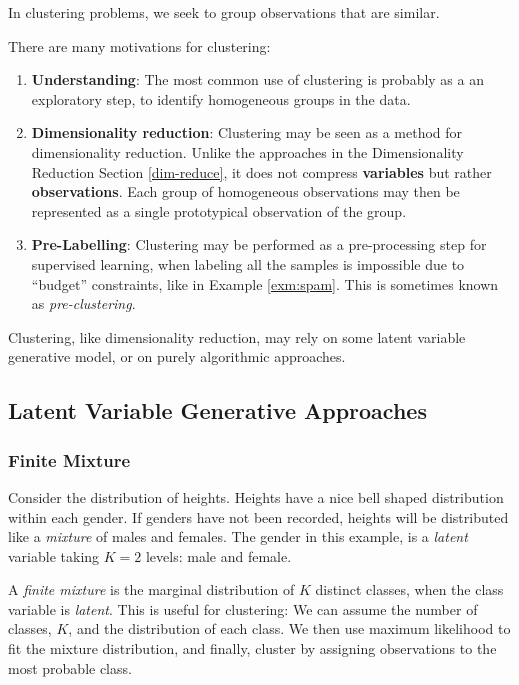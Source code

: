 \documentclass[]{book}
\providecommand{\tightlist}{%
  \setlength{\itemsep}{0pt}\setlength{\parskip}{0pt}}
\theoremstyle{definition}
\theoremstyle{definition}
\theoremstyle{definition}
\theoremstyle{remark}
\let\BeginKnitrBlock\begin \let\EndKnitrBlock\end
\begin{document}
In clustering problems, we seek to group observations that are similar.

There are many motivations for clustering:

\begin{enumerate}
\def\labelenumi{\arabic{enumi}.}
\tightlist
\item
  \textbf{Understanding}:
  The most common use of clustering is probably as a an exploratory step, to identify homogeneous groups in the data.
\item
  \textbf{Dimensionality reduction}:
  Clustering may be seen as a method for dimensionality reduction.
  Unlike the approaches in the Dimensionality Reduction Section \ref{dim-reduce}, it does not compress \textbf{variables} but rather \textbf{observations}.
  Each group of homogeneous observations may then be represented as a single prototypical observation of the group.
\item
  \textbf{Pre-Labelling}:
  Clustering may be performed as a pre-processing step for supervised learning, when labeling all the samples is impossible due to ``budget'' constraints, like in Example \ref{exm:spam}. This is sometimes known as \emph{pre-clustering}.
\end{enumerate}

Clustering, like dimensionality reduction, may rely on some latent variable generative model, or on purely algorithmic approaches.

\hypertarget{latent-variable-generative-approaches-1}{%
\subsection{Latent Variable Generative Approaches}\label{latent-variable-generative-approaches-1}}

\hypertarget{finite-mixture}{%
\subsubsection{Finite Mixture}\label{finite-mixture}}

\BeginKnitrBlock{example}
\protect\hypertarget{exm:males-females}{}{\label{exm:males-females} }Consider the distribution of heights.
Heights have a nice bell shaped distribution within each gender.
If genders have not been recorded, heights will be distributed like a \emph{mixture} of males and females.
The gender in this example, is a \emph{latent} variable taking \(K=2\) levels: male and female.
\EndKnitrBlock{example}

A \emph{finite mixture} is the marginal distribution of \(K\) distinct classes, when the class variable is \emph{latent}.
This is useful for clustering:
We can assume the number of classes, \(K\), and the distribution of each class.
We then use maximum likelihood to fit the mixture distribution, and finally, cluster by assigning observations to the most probable class.
\end{document}
